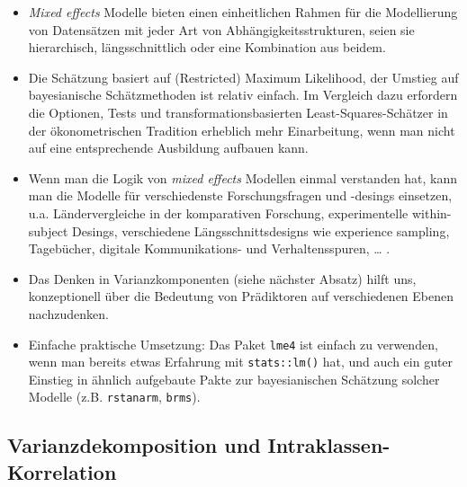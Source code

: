 \documentclass[
]{book}
\begin{document}
\begin{itemize}
\item
  \emph{Mixed effects} Modelle bieten einen einheitlichen Rahmen für die Modellierung von Datensätzen mit jeder Art von Abhängigkeitsstrukturen, seien sie hierarchisch, längsschnittlich oder eine Kombination aus beidem.
\item
  Die Schätzung basiert auf (Restricted) Maximum Likelihood, der Umstieg auf bayesianische Schätzmethoden ist relativ einfach. Im Vergleich dazu erfordern die Optionen, Tests und transformationsbasierten Least-Squares-Schätzer in der ökonometrischen Tradition erheblich mehr Einarbeitung, wenn man nicht auf eine entsprechende Ausbildung aufbauen kann.
\item
  Wenn man die Logik von \emph{mixed effects} Modellen einmal verstanden hat, kann man die Modelle für verschiedenste Forschungsfragen und -desings einsetzen, u.a. Ländervergleiche in der komparativen Forschung, experimentelle within-subject Desings, verschiedene Längsschnittsdesigns wie experience sampling, Tagebücher, digitale Kommunikations- und Verhaltensspuren, \ldots{} .
\item
  Das Denken in Varianzkomponenten (siehe nächster Absatz) hilft uns, konzeptionell über die Bedeutung von Prädiktoren auf verschiedenen Ebenen nachzudenken.
\item
  Einfache praktische Umsetzung: Das Paket \texttt{lme4} ist einfach zu verwenden, wenn man bereits etwas Erfahrung mit \texttt{stats::lm()} hat, und auch ein guter Einstieg in ähnlich aufgebaute Pakte zur bayesianischen Schätzung solcher Modelle (z.B. \texttt{rstanarm}, \texttt{brms}).
\end{itemize}

\hypertarget{varianzdekomposition-und-intraklassen-korrelation}{%
\subsection*{Varianzdekomposition und Intraklassen-Korrelation}\label{varianzdekomposition-und-intraklassen-korrelation}}
\end{document}
